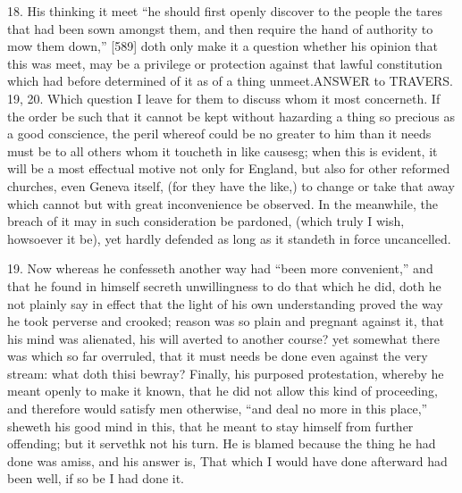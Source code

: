 18. His thinking it meet “he should first openly discover to the people the tares that had been sown amongst them, and then require the hand of authority to mow them down,” [589] doth only make it a question whether his opinion that this was meet, may be a privilege or protection against that lawful constitution which had before determined of it as of a thing unmeet.ANSWER to TRAVERS. 19, 20. Which question I leave for them to discuss whom it most concerneth. If the order be such that it cannot be kept without hazarding a thing so precious as a good conscience, the peril whereof could be no greater to him than it needs must be to all others whom it toucheth in like causesg; when this is evident, it will be a most effectual motive not only for England, but also for other reformed churches, even Geneva itself, (for they have the like,) to change or take that away which cannot but with great inconvenience be observed. In the meanwhile, the breach of it may in such consideration be pardoned, (which truly I wish, howsoever it be), yet hardly defended as long as it standeth in force uncancelled.

19. Now whereas he confesseth another way had “been more convenient,” and that he found in himself secreth unwillingness to do that which he did, doth he not plainly say in effect that the light of his own understanding proved the way he took perverse and crooked; reason was so plain and pregnant against it, that his mind was alienated, his will averted to another course? yet somewhat there was which so far overruled, that it must needs be done even against the very stream: what doth thisi bewray? Finally, his purposed protestation, whereby he meant openly to make it known, that he did not allow this kind of proceeding, and therefore would satisfy men otherwise, “and deal no more in this place,” sheweth his good mind in this, that he meant to stay himself from further offending; but it servethk not his turn. He is blamed because the thing he had done was amiss, and his answer is, That which I would have done afterward had been well, if so be I had done it.

